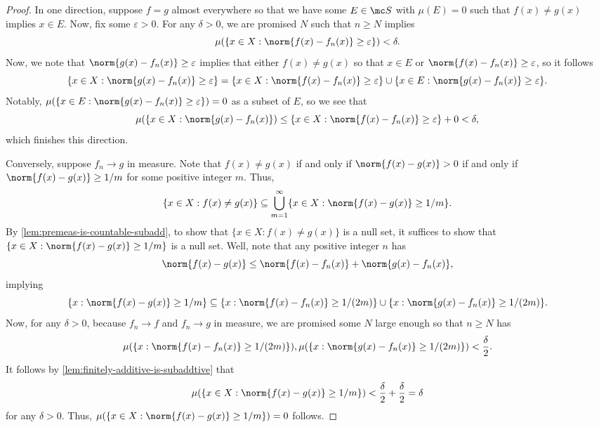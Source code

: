 \documentclass[../notes.tex]{subfiles}
\begin{document}
\begin{proof}
	In one direction, suppose $f=g$ almost everywhere so that we have some $E\in\mc S$ with $\mu(E)=0$ such that $f(x)\ne g(x)$ implies $x\in E$. Now, fix some $\varepsilon>0$. For any $\delta>0$, we are promised $N$ such that $n\ge N$ implies
	\[\mu(\{x\in X:\norm{f(x)-f_n(x)}\ge\varepsilon\})<\delta.\]
	Now, we note that $\norm{g(x)-f_n(x)}\ge\varepsilon$ implies that either $f(x)\ne g(x)$ so that $x\in E$ or $\norm{f(x)-f_n(x)}\ge\varepsilon$, so it follows
	\[\{x\in X:\norm{g(x)-f_n(x)}\ge\varepsilon\}=\{x\in X:\norm{f(x)-f_n(x)}\ge\varepsilon\}\cup\{x\in E:\norm{g(x)-f_n(x)}\ge\varepsilon\}.\]
	Notably, $\mu(\{x\in E:\norm{g(x)-f_n(x)}\ge\varepsilon\})=0$ as a subset of $E$, so we see that
	\[\mu(\{x\in X:\norm{g(x)-f_n(x)})\le\{x\in X:\norm{f(x)-f_n(x)}\ge\varepsilon\}+0<\delta,\]
	which finishes this direction.

	Conversely, suppose $f_n\to g$ in measure. Note that $f(x)\ne g(x)$ if and only if $\norm{f(x)-g(x)}>0$ if and only if $\norm{f(x)-g(x)}\ge1/m$ for some positive integer $m$. Thus,
	\[\{x\in X:f(x)\ne g(x)\}\subseteq\bigcup_{m=1}^\infty\{x\in X:\norm{f(x)-g(x)}\ge1/m\}.\]
	By \autoref{lem:premeas-is-countable-subadd}, to show that $\{x\in X:f(x)\ne g(x)\}$ is a null set, it suffices to show that $\{x\in X:\norm{f(x)-g(x)}\ge1/m\}$ is a null set. Well, note that any positive integer $n$ has
	\[\norm{f(x)-g(x)}\le\norm{f(x)-f_n(x)}+\norm{g(x)-f_n(x)},\]
	implying
	\[\{x:\norm{f(x)-g(x)}\ge1/m\}\subseteq\{x:\norm{f(x)-f_n(x)}\ge1/(2m)\}\cup\{x:\norm{g(x)-f_n(x)}\ge1/(2m)\}.\]
	Now, for any $\delta>0$, because $f_n\to f$ and $f_n\to g$ in measure, we are promised some $N$ large enough so that $n\ge N$ has
	\[\mu(\{x:\norm{f(x)-f_n(x)}\ge1/(2m)\}),\mu(\{x:\norm{g(x)-f_n(x)}\ge1/(2m)\})<\frac\delta2.\]
	It follows by \autoref{lem:finitely-additive-is-subaddtive} that
	\[\mu(\{x\in X:\norm{f(x)-g(x)}\ge1/m\})<\frac\delta2+\frac\delta2=\delta\]
	for any $\delta>0$. Thus, $\mu(\{x\in X:\norm{f(x)-g(x)}\ge1/m\})=0$ follows.
\end{proof}
\end{document}

